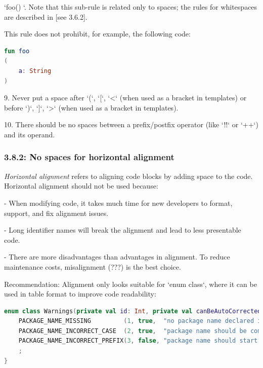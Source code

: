 {{{{   `foo() {}`. Note that this sub-rule is related only to spaces; the rules for whitespaces are described in [see 3.6.2].

    This rule does not prohibit, for example, the following code:

\begin{lstlisting}[language=Kotlin]
fun foo
(
    a: String
)
\end{lstlisting}


9. Never put a space after `(`, `[`, `<` (when used as a bracket in templates) or before `)`, `]`, `>` (when used as a bracket in templates).



10. There should be no spaces between a prefix/postfix operator (like `!!` or `++`) and its operand.



\subsubsection*{\textbf{3.8.2: No spaces for horizontal alignment}}
\leavevmode\newline

\label{sec:3.8.2}



\textit{Horizontal alignment} refers to aligning code blocks by adding space to the code. Horizontal alignment should not be used because:



- When modifying code, it takes much time for new developers to format, support, and fix alignment issues.

- Long identifier names will break the alignment and lead to less presentable code.

- There are more disadvantages than advantages in alignment. To reduce maintenance costs, misalignment (???) is the best choice.



Recommendation: Alignment only looks suitable for `enum class`, where it can be used in table format to improve code readability:

\begin{lstlisting}[language=Kotlin]
enum class Warnings(private val id: Int, private val canBeAutoCorrected: Boolean, private val warn: String) : Rule {
    PACKAGE_NAME_MISSING         (1, true,  "no package name declared in a file"),
    PACKAGE_NAME_INCORRECT_CASE  (2, true,  "package name should be completely in a lower case"),
    PACKAGE_NAME_INCORRECT_PREFIX(3, false, "package name should start from the company's domain")
    ;
}
\end{lstlisting}


}}}}
